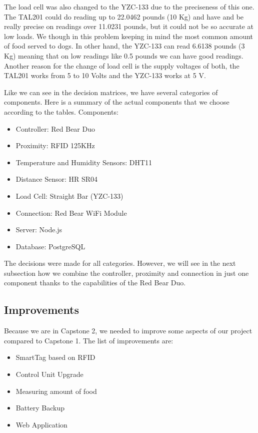 \documentclass[12pt]{article}
\begin{document}
The load cell was also changed to the YZC-133 due to the preciseness of this one. The TAL201 could do reading up to 22.0462 pounds (10 Kg) and have and be really precise on readings over 11.0231 pounds, but it could not be so accurate at low loads. We though in this problem keeping in mind the most common amount of food served to dogs. In other hand, the YZC-133 can read 6.6138 pounds (3 Kg) meaning that on low readings like 0.5 pounds we can have good readings. Another reason for the change of load cell is the supply voltages of both, the TAL201 works from 5 to 10 Volts and the YZC-133 works at 5 V.

Like we can see in the decision matrices, we have several categories of components. Here is a summary of the actual components that we choose according to the tables. Components:

\begin{itemize}
  \item Controller: Red Bear Duo
  \item Proximity: RFID 125KHz
  \item Temperature and Humidity Sensors: DHT11
  \item Distance Sensor: HR SR04
  \item Load Cell: Straight Bar (YZC-133)
  \item Connection: Red Bear WiFi Module
  \item Server: Node.js
  \item Database: PostgreSQL
\end{itemize}

The decisions were made for all categories. However, we will see in the next subsection how we combine the controller, proximity and connection in just one component thanks to the capabilities of the Red Bear Duo.

\subsection{Improvements}

Because we are in Capstone 2, we needed to improve some aspects of our project compared to Capstone 1. The list of improvements are:

\begin{itemize}
    \item SmartTag based on RFID
    \item Control Unit Upgrade
    \item Measuring amount of food
    \item Battery Backup
    \item Web Application
\end{itemize}
\end{document}
